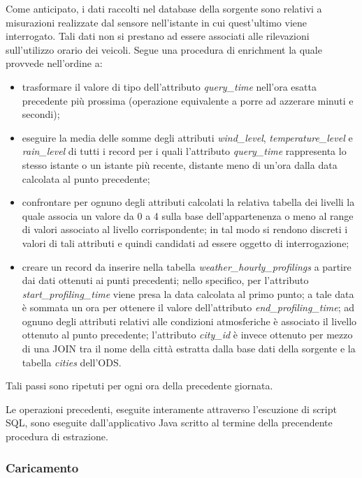 Come anticipato, i dati raccolti nel database della sorgente sono relativi a
misurazioni realizzate dal sensore nell'istante in cui quest'ultimo viene
interrogato. Tali dati non si prestano ad essere associati alle rilevazioni
sull'utilizzo orario dei veicoli. Segue una procedura di enrichment la quale
provvede nell'ordine a:
\begin{itemize}
\item trasformare il valore di tipo  dell'attributo
\textit{query\_time} nell'ora esatta precedente più prossima (operazione
equivalente a porre ad azzerare minuti e secondi);
\item eseguire la media delle somme degli attributi \textit{wind\_level},
\textit{temperature\_level} e \textit{rain\_level} di tutti i record per i
quali l'attributo \textit{query\_time} rappresenta lo stesso istante o un
istante più recente, distante meno di un'ora dalla data calcolata al punto
precedente;
\item confrontare per ognuno degli attributi calcolati la relativa tabella
dei livelli la quale associa un valore da 0 a 4 sulla base dell'appartenenza
o meno al range di valori associato al livello corrispondente; in tal modo si
rendono discreti i valori di tali attributi e quindi candidati ad essere 
oggetto di interrogazione;
\item creare un record da inserire nella tabella
\textit{weather\_hourly\_profilings} a partire dai dati ottenuti ai punti
precedenti; nello specifico, per l'attributo
\textit{start\_profiling\_time} viene presa la data calcolata al primo punto;
a tale data è sommata un ora per ottenere il valore dell'attributo
\textit{end\_profiling\_time}; ad ognuno degli attributi relativi alle
condizioni atmosferiche è associato il livello ottenuto al punto precedente;
l'attributo \textit{city\_id} è invece ottenuto per mezzo di una JOIN tra il
nome della città estratta dalla base dati della sorgente e la tabella
\textit{cities} dell'ODS.
\end{itemize}
Tali passi sono ripetuti per ogni ora della precedente giornata.

Le operazioni precedenti, eseguite interamente attraverso l'escuzione di script
SQL, sono eseguite dall'applicativo Java scritto al termine della precendente
procedura di estrazione.

\subsubsection{Caricamento}

